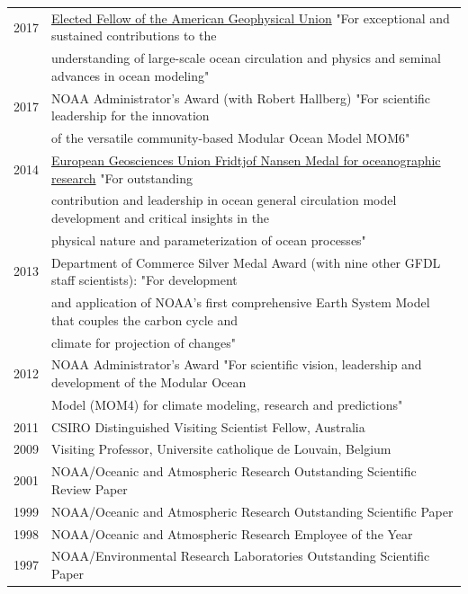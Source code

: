 \documentclass{article}
\begin{document}
\begin{tabular}{ll}
  2017 & \href{https://eos.org/agu-news/celebrating-the-2017-class-of-fellows}{Elected Fellow of the American Geophysical Union} "For exceptional and sustained contributions to the \\ &  understanding of large-scale ocean circulation and physics and seminal advances in ocean modeling"
\\
  2017 & NOAA Administrator's Award (with Robert Hallberg) "For scientific leadership for the innovation \\ & of the versatile  community-based Modular Ocean Model MOM6" \\ 
  2014 & \href{http://www.egu.eu/awards-medals/fridtjof-nansen/2014/stephen-m-griffies/}{European Geosciences Union Fridtjof Nansen Medal for
         oceanographic research}  "For 
outstanding \\ & contribution and leadership in 
ocean general circulation model development 
and critical insights in the \\ & physical 
nature and parameterization of ocean processes"
\\
  2013 & Department of Commerce Silver Medal Award (with nine other
  GFDL staff scientists): 
  "For development \\ & and application of NOAA's first comprehensive  
  Earth System Model  
  that couples the carbon cycle and \\ & climate for projection of changes" \\
  2012 & NOAA Administrator's Award "For scientific vision, leadership
  and development of 
  the Modular Ocean \\ & Model (MOM4) for climate modeling, research and
  predictions" \\
  2011 & CSIRO Distinguished Visiting Scientist Fellow, Australia \\
  2009 & Visiting Professor, Universite catholique de Louvain, Belgium\\
  2001 & NOAA/Oceanic and Atmospheric Research Outstanding Scientific
  Review Paper\\
  1999 & NOAA/Oceanic and Atmospheric Research Outstanding Scientific Paper\\
  1998 & NOAA/Oceanic and Atmospheric Research Employee of the Year\\
  1997 & NOAA/Environmental Research Laboratories Outstanding Scientific Paper\\
\end{tabular}
\end{document}
